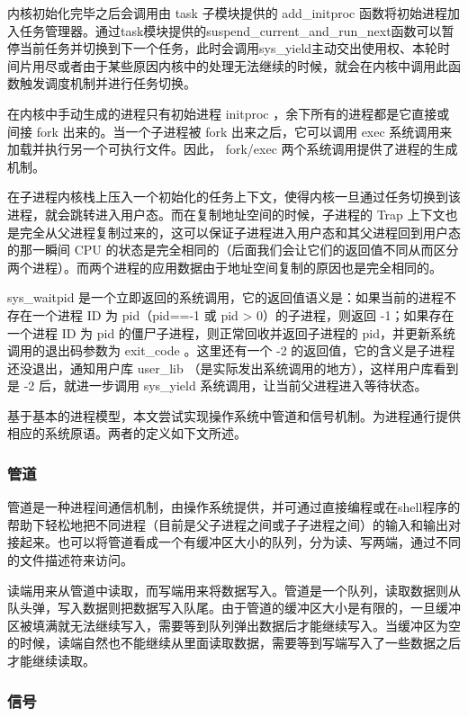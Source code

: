 内核初始化完毕之后会调用由 task 子模块提供的 add\_initproc 函数将初始进程加入任务管理器。通过task模块提供的suspend\_current\_and\_run\_next函数可以暂停当前任务并切换到下一个任务，此时会调用sys\_yield主动交出使用权、本轮时间片用尽或者由于某些原因内核中的处理无法继续的时候，就会在内核中调用此函数触发调度机制并进行任务切换。

在内核中手动生成的进程只有初始进程 initproc ，余下所有的进程都是它直接或间接 fork 出来的。当一个子进程被 fork 出来之后，它可以调用 exec 系统调用来加载并执行另一个可执行文件。因此， fork/exec 两个系统调用提供了进程的生成机制。

在子进程内核栈上压入一个初始化的任务上下文，使得内核一旦通过任务切换到该进程，就会跳转进入用户态。而在复制地址空间的时候，子进程的 Trap 上下文也是完全从父进程复制过来的，这可以保证子进程进入用户态和其父进程回到用户态的那一瞬间 CPU 的状态是完全相同的（后面我们会让它们的返回值不同从而区分两个进程）。而两个进程的应用数据由于地址空间复制的原因也是完全相同的。

sys\_waitpid 是一个立即返回的系统调用，它的返回值语义是：如果当前的进程不存在一个进程 ID 为 pid（pid==-1 或 pid > 0）的子进程，则返回 -1；如果存在一个进程 ID 为 pid 的僵尸子进程，则正常回收并返回子进程的 pid，并更新系统调用的退出码参数为 exit\_code 。这里还有一个 -2 的返回值，它的含义是子进程还没退出，通知用户库 user\_lib （是实际发出系统调用的地方），这样用户库看到是 -2 后，就进一步调用 sys\_yield 系统调用，让当前父进程进入等待状态。

基于基本的进程模型，本文尝试实现操作系统中管道和信号机制。为进程通行提供相应的系统原语。两者的定义如下文所述。

\subsubsection{管道}


管道是一种进程间通信机制，由操作系统提供，并可通过直接编程或在shell程序的帮助下轻松地把不同进程（目前是父子进程之间或子子进程之间）的输入和输出对接起来。也可以将管道看成一个有缓冲区大小的队列，分为读、写两端，通过不同的文件描述符来访问。

读端用来从管道中读取，而写端用来将数据写入。管道是一个队列，读取数据则从队头弹，写入数据则把数据写入队尾。由于管道的缓冲区大小是有限的，一旦缓冲区被填满就无法继续写入，需要等到队列弹出数据后才能继续写入。当缓冲区为空的时候，读端自然也不能继续从里面读取数据，需要等到写端写入了一些数据之后才能继续读取。

\subsubsection{信号}

